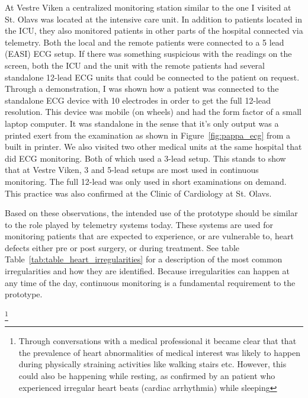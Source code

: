 At Vestre Viken a centralized monitoring station similar to the one I visited at St. Olavs was located at the intensive care unit. In addition to patients located in the ICU, they also monitored patients in other parts of the hospital connected via telemetry. Both the local and the remote patients were connected to a 5 lead (EASI) ECG setup. If there was something suspicious with the readings on the screen, both the ICU and the unit with the remote patients had several standalone 12-lead ECG units that could be connected to the patient on request. Through a demonstration, I was shown how a patient was connected to the standalone ECG device with 10 electrodes in order to get the full 12-lead resolution. This device was mobile (on wheels) and had the form factor of a small laptop computer. It was standalone in the sense that it's only output was a printed exert from the examination as shown in Figure~\ref{fig:pappa_ecg} from a built in printer. We also visited two other medical units at the same hospital that did ECG monitoring. Both of which used a 3-lead setup. This stands to show that at Vestre Viken, 3 and 5-lead setups are most used in continuous monitoring. The full 12-lead was only used in short examinations on demand. This practice was also confirmed at the Clinic of Cardiology at St. Olavs.


Based on these observations, the intended use of the prototype should be similar to the role played by telemetry systems today. These systems are used for monitoring patients that are expected to experience, or are vulnerable to, heart defects either pre or post surgery, or during treatment. See table Table~\ref{tab:table_heart_irregularities} for a description of the most common irregularities and how they are identified. Because irregularities can happen at any time of the day, continuous monitoring is a fundamental requirement to the prototype.


\footnote{Through conversations with a medical professional it became clear that that the prevalence of heart abnormalities of medical interest was likely to happen during physically straining activities like walking stairs etc. However, this could also be happening while resting, as confirmed by an patient who experienced irregular heart beats (cardiac arrhythmia) while sleeping}



